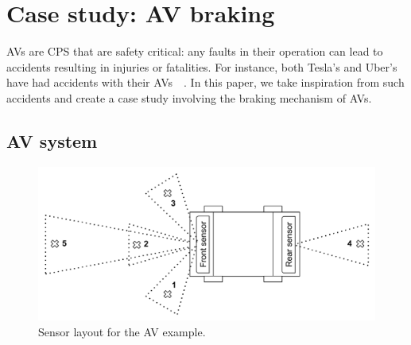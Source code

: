 \section{Case study: \acf{AV} braking}
\label{sec:case}

\acfp{AV} are \acf{CPS} that are safety critical: any faults in their operation can lead to accidents resulting in injuries or fatalities.
For instance, both Tesla's and Uber's have had accidents with their \acp{AV}~\cite{coldewey_2018}~\cite{stewart_2018}.
In this paper, we take inspiration from such accidents and create a case study involving the braking mechanism of \acp{AV}.

\subsection{\acf{AV} system}
\begin{figure}[h]
	\centering
	\includegraphics[width=\linewidth]{Content/fig/AV.pdf}
	\caption{Sensor layout for the \ac{AV} example. \label{fig:av}}
\end{figure}


